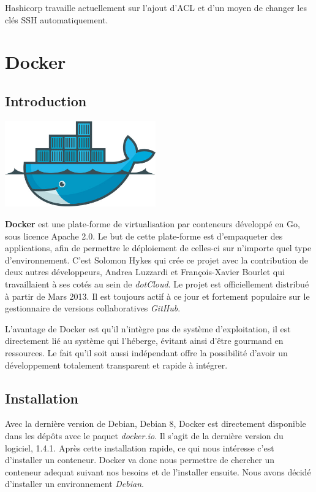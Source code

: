 \documentclass[12pt,a4paper]{article}
\begin{document}
Hashicorp travaille actuellement sur l'ajout d'ACL et d'un moyen de changer les clés SSH automatiquement.	

\section{Docker}

\subsection{Introduction}
\begin{center}
  \includegraphics[width=6.5cm]{images_rapport/docker_logo.jpg}
\end{center}

\newpage

\textbf{Docker} est une plate-forme de virtualisation par conteneurs développé en Go, sous licence Apache 2.0. Le but de cette plate-forme est d'empaqueter des applications, afin de permettre le déploiement de celles-ci sur n'importe quel type d'environnement. C'est Solomon Hykes qui crée ce projet avec la contribution de deux autres développeurs, Andrea Luzzardi et François-Xavier Bourlet qui travaillaient à ses cotés au sein de \textit{dotCloud}. Le projet est officiellement distribué à partir de Mars 2013. Il est toujours actif à ce jour et fortement populaire sur le gestionnaire de versions collaboratives \textit{GitHub}.

L'avantage de Docker est qu'il n'intègre pas de système d'exploitation, il est directement lié au système qui l'héberge, évitant ainsi d'être gourmand en ressources. Le fait qu'il soit aussi indépendant offre la possibilité d'avoir un développement totalement transparent et rapide à intégrer. 

\subsection{Installation}
Avec la dernière version de Debian, Debian 8, Docker est directement disponible dans les dépôts avec le paquet \textit{docker.io}. Il s'agit de la dernière version du logiciel, 1.4.1. Après cette installation rapide, ce qui nous intéresse c'est d'installer un conteneur. Docker va donc nous permettre de chercher un conteneur adequat suivant nos besoins et de l'installer ensuite. Nous avons décidé d'installer un environnement \textit{Debian}.
\end{document}

